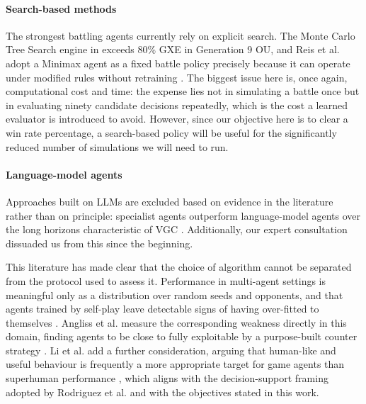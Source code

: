 \documentclass[conference]{IEEEtran}
\begin{document}
\paragraph{Search-based methods}
The strongest battling agents currently rely on explicit search. The Monte
Carlo Tree Search engine in \cite{karten2026} exceeds 80\% GXE in
Generation 9 OU, and Reis et al. adopt a
Minimax agent as a fixed battle policy precisely because it can
operate under modified rules without retraining \cite{reis2024}. The biggest issue here is, once again, computational cost and time: the expense lies not in simulating a battle once but in evaluating ninety candidate decisions repeatedly, which is the cost a learned evaluator is
introduced to avoid. However, since our objective here is to clear a win rate percentage, a search-based policy will be useful for the significantly reduced number of simulations we will need to run.

\paragraph{Language-model agents}
Approaches built on LLMs are excluded based on evidence in the
literature rather than on principle: specialist agents outperform language-model agents over
the long horizons characteristic of VGC \cite{karten2026} \cite{grigsby2025}. Additionally, our expert consultation dissuaded us from this since the beginning.


This literature has made clear that the choice of algorithm cannot
be separated from the protocol used to assess it. Performance in multi-agent settings is meaningful only as a distribution
over random seeds and opponents, and that agents trained by self-play leave
detectable signs of having over-fitted to themselves \cite{liwellman2024}.
Angliss et al. measure the corresponding weakness directly in this domain,
finding agents to be close to fully exploitable by a purpose-built counter
strategy \cite{angliss2026}. Li et al. add a further consideration, arguing that
human-like and useful behaviour is frequently a more appropriate target for game
agents than superhuman performance \cite{li2025}, which aligns with the
decision-support framing adopted by Rodriguez et al. \cite{rodriguez2024} and
with the objectives stated in this work.
\end{document}
